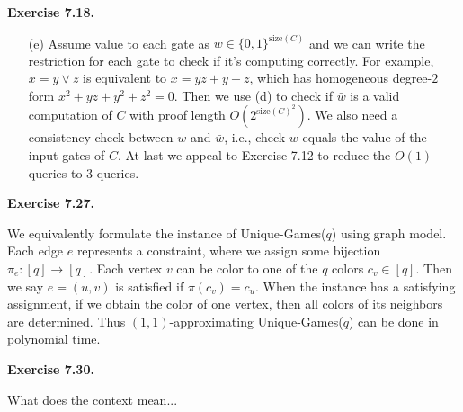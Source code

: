 \documentclass[a4paper]{article}
\newenvironment{exercise}[1]{
	\par
	\noindent\textbf{Exercise #1.}\quad
}{
	\par
	\bigskip
}
\newcommand{\pbra}[1]{{\left( #1 \right)}}
\newcommand{\bin}{{\{0,1\}}}
\begin{document}
\begin{exercise}{7.18}
\begin{itemize}
\begin{itemize}
            \end{itemize}
        \item[(e)] Assume value to each gate as $\bar w\in\bin^{\text{size}(C)}$ and we can write the restriction for each gate
            to check if it's computing correctly. For example, $x=y\lor z$ is equivalent to $x=yz+y+z$, 
            which has homogeneous degree-$2$ form $x^2+yz+y^2+z^2=0$. Then we use (d) to check if $\bar w$ is a valid 
            computation of $C$ with proof length $O\pbra{2^{\text{size}(C)^2}}$. We also need a consistency check between
            $w$ and $\bar w$, i.e., check $w$ equals the value of the input gates of $C$.
            At last we appeal to Exercise 7.12 to reduce the $O(1)$ queries to $3$ queries.
    \end{itemize}
\end{exercise}

\begin{exercise}{7.27}
    We equivalently formulate the instance of Unique-Games($q$) using graph model.
    Each edge $e$ represents a constraint, where we assign some bijection $\pi_e:[q]\to[q]$.
    Each vertex $v$ can be color to one of the $q$ colors $c_v\in[q]$.
    Then we say $e=(u,v)$ is satisfied if $\pi(c_v)=c_u$.
    When the instance has a satisfying assignment, if we obtain the color of one vertex, then all colors of its neighbors
    are determined. Thus $(1,1)$-approximating Unique-Games($q$) can be done in polynomial time.
\end{exercise}

\begin{exercise}{7.30}
    What does the context mean...
\end{exercise}
\end{document}
